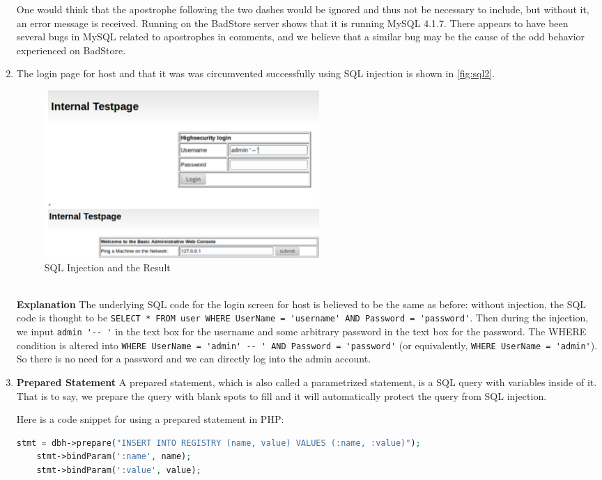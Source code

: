 \begin{enumerate}
One would think that the apostrophe following the two dashes would be ignored and thus not be necessary to include, but without it, an error message is received. Running  on the BadStore server shows that it is running MySQL 4.1.7. There appears to have been several bugs in MySQL related to apostrophes in comments\cite{quoteComment1}\cite{quoteComment2}, and we believe that a similar bug may be the cause of the odd behavior experienced on BadStore.
\item The login page for host  and that it was was circumvented successfully using SQL injection is shown in \autoref{fig:sql2}.
\begin{figure}[h!]
	\caption{SQL Injection and the Result}
        \label{fig:sql2}
	\centering \includegraphics[height=2.5in]{sqli2}
\end{figure}
\\
  \textbf{Explanation} The underlying SQL code for the login screen for host  is believed to be the same as before: without injection, the SQL code is thought to be \lstinline{SELECT * FROM user WHERE UserName = 'username' AND Password = 'password'}. Then during the injection, we input \lstinline{admin '-- '} in the text box for the username and some arbitrary password in the text box for the password. The WHERE condition is altered into \lstinline{WHERE UserName = 'admin' -- ' AND Password = 'password'} (or equivalently, \lstinline{WHERE UserName = 'admin'}). So there is no need for a password and we can directly log into the admin account.
\item \textbf{Prepared Statement} 
  A prepared statement, which is also called a parametrized statement, is a SQL query with variables inside of it. That is to say, we prepare the query with blank spots to fill and it will automatically protect the query from SQL injection.

  Here is a code snippet for using a prepared statement in PHP\cite{php}:
  \begin{lstlisting}[language = php]
    stmt = dbh->prepare("INSERT INTO REGISTRY (name, value) VALUES (:name, :value)");
    stmt->bindParam(':name', name);
    stmt->bindParam(':value', value);
  \end{lstlisting}


\end{enumerate}
